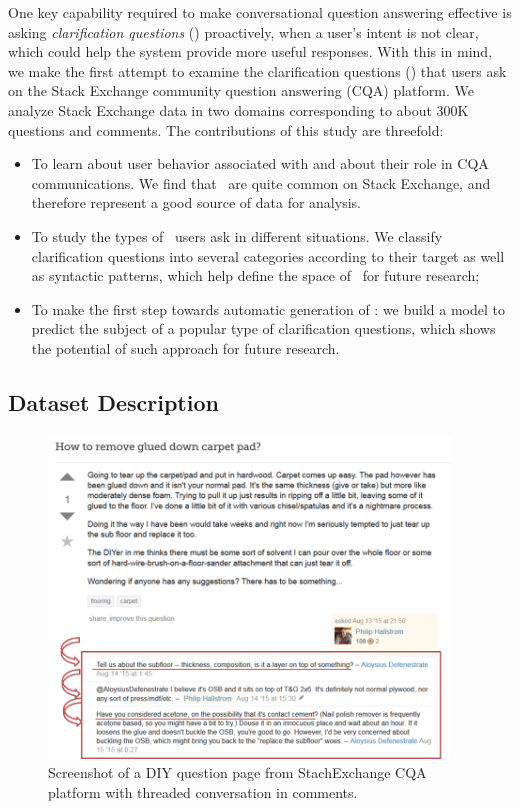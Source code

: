 One key capability required to make conversational question answering effective is asking \textit{clarification questions} (\clarQ) proactively, when a user's intent is not clear, which could help the system provide more useful responses.
With this in mind, we make the first attempt to examine the clarification questions (\clarQ) that users ask on the Stack Exchange community question answering (CQA) platform.
We analyze Stack Exchange data in two domains
corresponding to about 300K questions and comments.
The contributions of this study are threefold:
\begin{itemize}
\item To learn about user behavior associated with \clarQ and about their role in CQA communications. We find that \clarQ~are quite common on Stack Exchange, and therefore represent a good source of data for analysis.
\item To study the types of \clarQ~users ask in different situations. We classify clarification questions into several categories according to their target as well as syntactic patterns, which help define the space of \clarQ~for future research;
\item To make the first step towards automatic generation of \clarQ: 
we build a model to predict the subject of a popular type of clarification questions, which shows the potential of such approach for future research.
\end{itemize}

\subsection{Dataset Description}
\label{section:conversation:clarq:data}

\begin{figure}[t]
\centering
\includegraphics[width=0.95\textwidth]{img/diy}
\caption{Screenshot of a DIY question page from StachExchange CQA platform with threaded conversation in comments.}
\label{figure:conversation:clarq:diy}
\end{figure}

